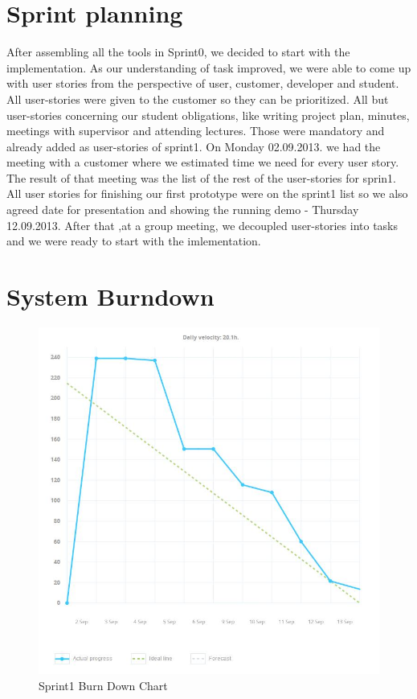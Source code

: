 \section{Sprint planning}
After assembling all the tools in Sprint0, we decided to start with the implementation.
As our understanding of task improved, we were able to come up with user stories from the perspective of user, customer, developer and student.
All user-stories were given to the customer so they can be prioritized. 
All but user-stories concerning our student obligations, like writing project plan, minutes, meetings with supervisor and attending lectures.
Those were mandatory and already added as user-stories of sprint1.
On Monday 02.09.2013. we had the meeting with a customer where we estimated time we need for every user story.
The result of that meeting was the list of the rest of the user-stories for sprin1.
All user stories for finishing our first prototype were on the sprint1 list so we also agreed date for presentation and showing the running demo - Thursday 12.09.2013. 
After that ,at a group meeting, we decoupled user-stories into tasks and we were ready to start with the imlementation.


\section{System Burndown}

\begin{figure}[!t]
	\centering
		\includegraphics[width=16cm]{burn_down_chart.jpg}
	\caption{Sprint1 Burn Down Chart}
	\label{fig:sprint1_burn_down_chart}
\end{figure}

